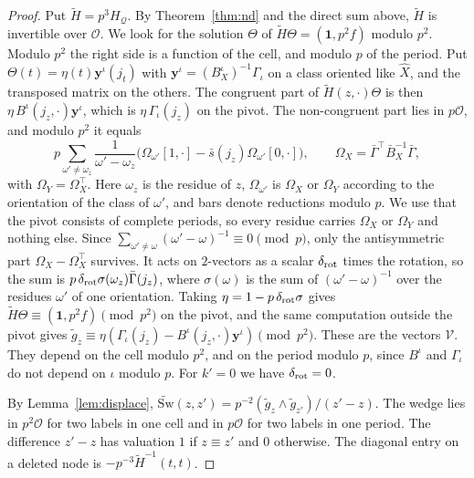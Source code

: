 \documentclass[11pt]{amsart}
\theoremstyle{definition}
\theoremstyle{remark}
\numberwithin{equation}{section}
\newcommand{\cO}{\mathcal O}
\begin{document}
\begin{proof}
Put $\widetilde H=p^3H_{\mathcal Q}$. By Theorem~\ref{thm:nd} and the direct sum above,
$\widetilde H$ is invertible over $\cO$. We look for the solution $\Theta$ of
$\widetilde H\Theta=(\mathbf 1,p^2f)$ modulo $p^2$. Modulo $p^2$ the right side is a function of the cell,
and modulo $p$ of the period. Put $\Theta(t)=\eta(t)\mathbf y^\iota(j_t)$ with
$\mathbf y^\iota=(B^\iota_X)^{-1}\Gamma_\iota$ on a class oriented like $\hat X$, and the transposed matrix
on the others. The congruent part of $\widetilde H(z,\cdot)\Theta$ is then
$\eta\,B^\iota(j_z,\cdot)\mathbf y^\iota$, which is $\eta\,\Gamma_\iota(j_z)$ on the pivot. The
non-congruent part lies in $p\cO$, and modulo $p^2$ it equals
\[
 p\sum_{\omega'\ne\omega_z}\frac1{\omega'-\omega_z}\bigl(\Omega_{\omega'}[1,\cdot]-\bar s(j_z)\Omega_{\omega'}[0,\cdot]\bigr),
 \qquad \Omega_X=\bar\Gamma^\top\bar B_X^{-1}\bar\Gamma ,
\]
with $\Omega_Y=\Omega_X^\top$. Here $\omega_z$ is the residue of $z$, $\Omega_{\omega'}$ is $\Omega_X$ or $\Omega_Y$ according to
the orientation of the class of $\omega'$, and bars denote reductions modulo $p$. We use that the pivot consists of complete
periods, so every residue carries $\Omega_X$ or $\Omega_Y$ and nothing else. Since
$\sum_{\omega'\ne\omega}(\omega'-\omega)^{-1}\equiv0\pmod p$, only the antisymmetric part $\Omega_X-\Omega_X^\top$ survives.
It acts on $2$-vectors as a scalar $\delta_{\rm rot}$ times the rotation, so the sum is
$p\,\delta_{\rm rot}\sigma(\omega_z)\bar\Gamma(j_z)$, where $\sigma(\omega)$ is the sum of $(\omega'-\omega)^{-1}$ over the
residues $\omega'$ of one orientation. Taking $\eta=1-p\,\delta_{\rm rot}\sigma$ gives
$\widetilde H\Theta\equiv(\mathbf 1,p^2f)\pmod{p^2}$ on the pivot, and the same computation outside the
pivot gives $\tilde g_z\equiv\eta(\Gamma_\iota(j_z)-B^\iota(j_z,\cdot)\mathbf y^\iota)\pmod{p^2}$.
These are the vectors $\mathcal V$. They depend on the cell modulo $p^2$, and on the period modulo $p$, since
$B^\iota$ and $\Gamma_\iota$ do not depend on $\iota$ modulo $p$. For $k'=0$ we have $\delta_{\rm rot}=0$.

By Lemma~\ref{lem:displace}, $\widetilde{\mathrm{Sw}}(z,z')=p^{-2}(\tilde g_z\wedge\tilde g_{z'})/(z'-z)$. The wedge lies
in $p^2\cO$ for two labels in one cell and in $p\cO$ for two labels in one period. The difference $z'-z$ has valuation
$1$ if $z\equiv z'$ and $0$ otherwise. The diagonal entry on a deleted node is $-p^{-3}\widetilde H^{-1}(t,t)$.
\end{proof}
\end{document}
